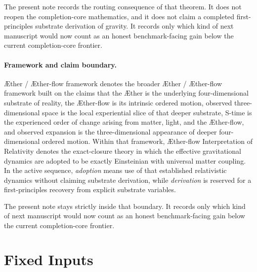\documentclass[11pt]{article}
\newcommand{\Aether}{\AE{}ther}
\newcommand{\Aflow}{\AE{}ther-flow}
\newcommand{\TheoryName}{\Aflow{} Interpretation of Relativity}
\newcommand{\TheoryProgram}{\Aether{} / \Aflow{} framework}
\begin{document}
The present note records the routing consequence of that theorem. It does not reopen the completion-core mathematics, and it does not claim a completed first-principles substrate derivation of gravity. It records only which kind of next manuscript would now count as an honest benchmark-facing gain below the current completion-core frontier.

\paragraph{Framework and claim boundary.}
\TheoryProgram{} denotes the broader \Aether{} / \Aflow{} framework built on the claims that the \Aether{} is the underlying four-dimensional substrate of reality, the \Aflow{} is its intrinsic ordered motion, observed three-dimensional space is the local experiential slice of that deeper substrate, S-time is the experienced order of change arising from matter, light, and the \Aflow{}, and observed expansion is the three-dimensional appearance of deeper four-dimensional ordered motion. Within that framework, \TheoryName{} denotes the exact-closure theory in which the effective gravitational dynamics are adopted to be exactly Einsteinian with universal matter coupling. In the active sequence, \emph{adoption} means use of that established relativistic dynamics without claiming substrate derivation, while \emph{derivation} is reserved for a first-principles recovery from explicit substrate variables.

The present note stays strictly inside that boundary. It records only which kind of next manuscript would now count as an honest benchmark-facing gain below the current completion-core frontier.

\section{Fixed Inputs}
\end{document}
